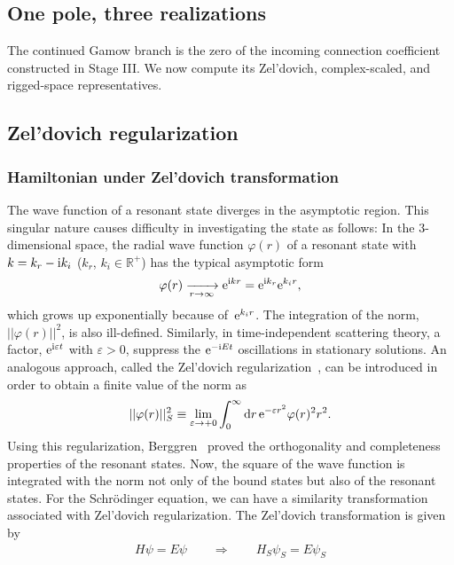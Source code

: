 \subsection{One pole, three realizations}
The continued Gamow branch is the zero of the incoming connection coefficient
constructed in Stage III.  We now compute its Zel'dovich, complex-scaled, and
rigged-space representatives.
\subsection{Zel'dovich regularization}
\subsubsection{Hamiltonian under Zel'dovich transformation}
The wave function of a resonant state diverges in the asymptotic region.
This singular nature causes difficulty in investigating the state as follows: In the $3$-dimensional space, the radial wave function $\varphi(r)$ of a resonant state with $k=k_{r}-\mathrm{i} k_{i}$ ($k_{r}$, $k_{i}\in\mathbb{R}^{+}$) has the typical asymptotic form
\begin{align}
 \varphi(r) \xrightarrow[r\to\infty]{}\mathrm{e}^{\mathrm{i} kr} = \mathrm{e}^{\mathrm{i} k_{r}}\mathrm{e}^{k_{i}r},
\end{align}
which grows up exponentially because of~$\mathrm{e}^{k_{i}r}$.
The integration of the norm, $||\varphi(r)||^2$, is also ill-defined.
Similarly, in time-independent scattering theory,
a factor, $\mathrm{e}^{\mathrm{i} \varepsilon t}$ with $\varepsilon>0$, suppress the $\mathrm{e}^{-\mathrm{i} Et}$ oscillations in stationary solutions.
An analogous approach, called the Zel'dovich regularization~\cite{Zel'dovich:1961}, can be introduced in order to obtain a finite value of the norm as
\begin{align}
 ||\varphi(r)||_S^2\equiv\lim_{\varepsilon\to+0}\int_{0}^{\infty} \mathrm{d} r\, \mathrm{e}^{-\varepsilon r^2}\varphi(r)^2r^2 .
\end{align}
Using this regularization, Berggren~\cite{Berggren:1968zz} proved the orthogonality and completeness properties of the resonant states.
Now, the square of the wave function is integrated with the norm not only of the bound states but also of the resonant states.
For the Schr\"odinger equation,
we can have a similarity transformation associated with Zel'dovich regularization.
The Zel'dovich transformation is given by
\begin{align}
    H\psi = E\psi
    \qquad\Rightarrow\qquad
    H_S\psi_S = E\psi_S
\end{align}
